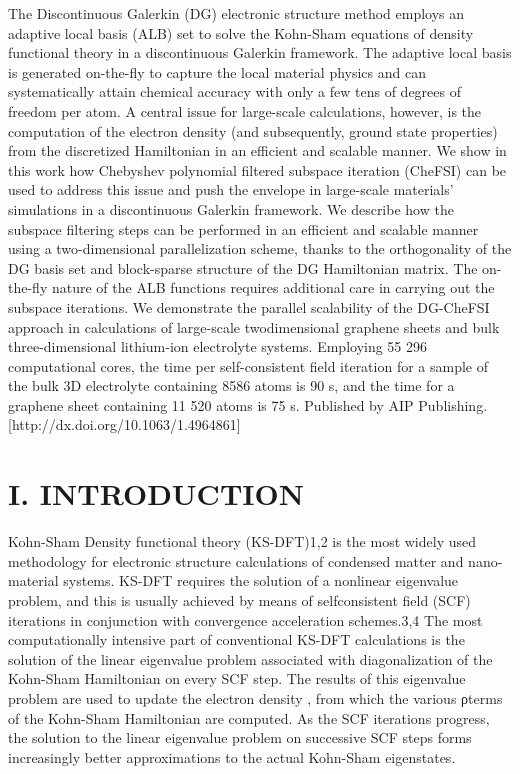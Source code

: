 \documentclass[
  10
]{article}
\begin{document}
The Discontinuous Galerkin (DG) electronic structure method employs an
adaptive local basis (ALB) set to solve the Kohn-Sham equations of
density functional theory in a discontinuous Galerkin framework. The
adaptive local basis is generated on-the-fly to capture the local
material physics and can systematically attain chemical accuracy with
only a few tens of degrees of freedom per atom. A central issue for
large-scale calculations, however, is the computation of the electron
density (and subsequently, ground state properties) from the discretized
Hamiltonian in an efficient and scalable manner. We show in this work
how Chebyshev polynomial filtered subspace iteration (CheFSI) can be
used to address this issue and push the envelope in large-scale
materials' simulations in a discontinuous Galerkin framework. We
describe how the subspace filtering steps can be performed in an
efficient and scalable manner using a two-dimensional parallelization
scheme, thanks to the orthogonality of the DG basis set and block-sparse
structure of the DG Hamiltonian matrix. The on-the-fly nature of the ALB
functions requires additional care in carrying out the subspace
iterations. We demonstrate the parallel scalability of the DG-CheFSI
approach in calculations of large-scale twodimensional graphene sheets
and bulk three-dimensional lithium-ion electrolyte systems. Employing 55
296 computational cores, the time per self-consistent field iteration
for a sample of the bulk 3D electrolyte containing 8586 atoms is 90 s,
and the time for a graphene sheet containing 11 520 atoms is 75 s.
Published by AIP Publishing. {[}http://dx.doi.org/10.1063/1.4964861{]}

\section{I. INTRODUCTION}\label{i.-introduction}

Kohn-Sham Density functional theory (KS-DFT)1,2 is the most widely used
methodology for electronic structure calculations of condensed matter
and nano-material systems. KS-DFT requires the solution of a nonlinear
eigenvalue problem, and this is usually achieved by means of
selfconsistent field (SCF) iterations in conjunction with convergence
acceleration schemes.3,4 The most computationally intensive part of
conventional KS-DFT calculations is the solution of the linear
eigenvalue problem associated with diagonalization of the Kohn-Sham
Hamiltonian on every SCF step. The results of this eigenvalue problem
are used to update the electron density , from which the various ρterms
of the Kohn-Sham Hamiltonian are computed. As the SCF iterations
progress, the solution to the linear eigenvalue problem on successive
SCF steps forms increasingly better approximations to the actual
Kohn-Sham eigenstates.
\end{document}
